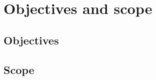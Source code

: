\chapter{Objectives and scope}
\label{Ch:ObjectivesScope}

\section{Objectives}
\label{Sec:Objectives}


\section{Scope}
\label{Sec:Scope}

